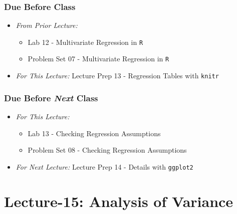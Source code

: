 \documentclass[]{book}
\providecommand{\tightlist}{%
  \setlength{\itemsep}{0pt}\setlength{\parskip}{0pt}}
\theoremstyle{definition}
\theoremstyle{definition}
\theoremstyle{definition}
\theoremstyle{remark}
\begin{document}
\hypertarget{due-before-class-13}{%
\subsubsection*{Due Before Class}\label{due-before-class-13}}

\begin{itemize}
\tightlist
\item
  \emph{From Prior Lecture:}

  \begin{itemize}
  \tightlist
  \item
    Lab 12 - Multivariate Regression in \texttt{R}
  \item
    Problem Set 07 - Multivariate Regression in \texttt{R}
  \end{itemize}
\item
  \emph{For This Lecture:} Lecture Prep 13 - Regression Tables with
  \texttt{knitr}
\end{itemize}

\hypertarget{due-before-next-class-13}{%
\subsubsection*{\texorpdfstring{Due Before \emph{Next}
Class}{Due Before Next Class}}\label{due-before-next-class-13}}

\begin{itemize}
\tightlist
\item
  \emph{For This Lecture:}

  \begin{itemize}
  \tightlist
  \item
    Lab 13 - Checking Regression Assumptions
  \item
    Problem Set 08 - Checking Regression Assumptions
  \end{itemize}
\item
  \emph{For Next Lecture:} Lecture Prep 14 - Details with
  \texttt{ggplot2}
\end{itemize}

\hypertarget{lecture-15-analysis-of-variance}{%
\section*{Lecture-15: Analysis of
Variance}\label{lecture-15-analysis-of-variance}}
\end{document}
